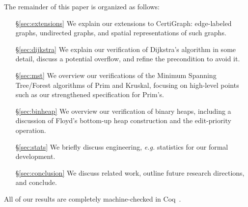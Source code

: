 The remainder of this paper is organized as follows:
\begin{itemize}
    \item[\S\ref{sec:extensions}] We explain our extensions to CertiGraph: edge-labeled graphs, undirected graphs, and spatial representations of such graphs.
    \item[\S\ref{sec:dijkstra}] We explain our verification of Dijkstra's algorithm in some detail, discuss a potential overflow, and refine the precondition to avoid it. %
    \item[\S\ref{sec:mst}] We overview our verifications of the Minimum Spanning Tree/Forest algorithms of Prim and Kruskal, focusing on high-level points such as our strengthened specification for Prim's.
    \item[\S\ref{sec:binheap}] We overview our verification of binary heaps, including a discussion of Floyd's bottom-up heap construction and the edit-priority operation.
    \item[\S\ref{sec:stats}] We briefly discuss engineering, \emph{e.g.} statistics for our formal development.
    \item[\S\ref{sec:conclusion}] We discuss related work, outline future research directions, and conclude.
\end{itemize}

\noindent All of our results are completely machine-checked in Coq~\cite{Coq}.%
